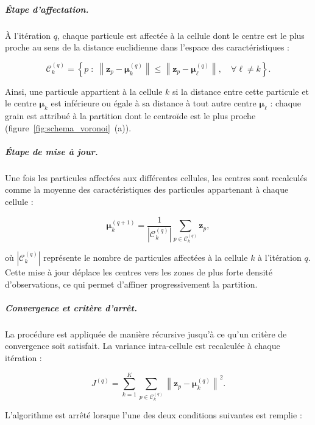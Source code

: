 \documentclass[french]{MemoireMaster}
\begin{document}
\subparagraph{Étape d'affectation.}
À l'itération $q$, chaque particule est affectée à la cellule dont le centre est le plus proche au sens de la distance euclidienne dans l'espace des caractéristiques :

\begin{equation}
  \mathcal{C}_k^{(q)}
  =
  \left\{
    p \; : \;
    \left\|
      \mathbf{z}_p - \boldsymbol{\mu}_k^{(q)}
    \right\|
    \leq
    \left\|
      \mathbf{z}_p - \boldsymbol{\mu}_\ell^{(q)}
    \right\|,
    \quad
    \forall \ell \neq k
  \right\}.
  \label{eq:affectation_kmeans}
\end{equation}

Ainsi, une particule appartient à la cellule $k$ si la distance entre cette particule et le centre $\boldsymbol{\mu}_k$ est inférieure ou égale à sa distance à tout autre centre $\boldsymbol{\mu}_\ell$ : chaque grain est attribué à la partition dont le centroïde est le plus proche (figure~\ref{fig:schema_voronoi}~(a)).

\subparagraph{Étape de mise à jour.}
Une fois les particules affectées aux différentes cellules, les centres sont recalculés comme la moyenne des caractéristiques des particules appartenant à chaque cellule :

\begin{equation}
  \boldsymbol{\mu}_k^{(q+1)}
  =
  \frac{1}{\left|\mathcal{C}_k^{(q)}\right|}
  \sum_{p \in \mathcal{C}_k^{(q)}}
  \mathbf{z}_p,
  \label{eq:update_kmeans}
\end{equation}

où $\left|\mathcal{C}_k^{(q)}\right|$ représente le nombre de particules affectées à la cellule $k$ à l'itération $q$. Cette mise à jour déplace les centres vers les zones de plus forte densité d'observations, ce qui permet d'affiner progressivement la partition.

\subparagraph{Convergence et critère d'arrêt.}
La procédure est appliquée de manière récursive jusqu'à ce qu'un critère de convergence soit satisfait. La variance intra-cellule est recalculée à chaque itération :

\begin{equation}
  J^{(q)}
  =
  \sum_{k=1}^{K}
  \sum_{p \in \mathcal{C}_k^{(q)}}
  \left\|
    \mathbf{z}_p - \boldsymbol{\mu}_k^{(q)}
  \right\|^2 .
  \label{eq:variance_kmeans}
\end{equation}

L'algorithme est arrêté lorsque l'une des deux conditions suivantes est remplie :
\end{document}
